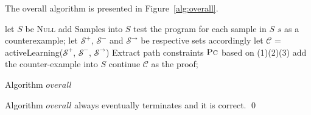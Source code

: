 The overall algorithm is presented in Figure~\ref{alg:overall}.
\begin{algorithm}[!h]
\SetAlgoVlined
\Indm
{}
\Indp
let $S$ be \textsc{Null}\;
 {
    add Samples into $S$\;
    test the program for each sample in $S$\;
     {
        \Return $s$ as a counterexample;
    }
    let $\mathcal{S}^+$, $\mathcal{S}^-$ and $\mathcal{S}^\rightarrow$ be respective sets accordingly\;
    let $\mathcal{C}$ = activeLearning($\mathcal{S}^+$, $\mathcal{S}^-$, $\mathcal{S}^\rightarrow$)\;
    Extract path constraints $\textsc{Pc}$ based on (1)(2)(3)\;
     {
         {
            add the counter-example into $S$\;
            continue\;
        }
    }
    \Return $\mathcal{C}$ as the proof;
}
\caption{Algorithm $overall$}
\label{alg:overall}
\end{algorithm}


\begin{theorem}
Algorithm $overall$ always eventually terminates and it is correct. \hfill \qed
\end{theorem}


